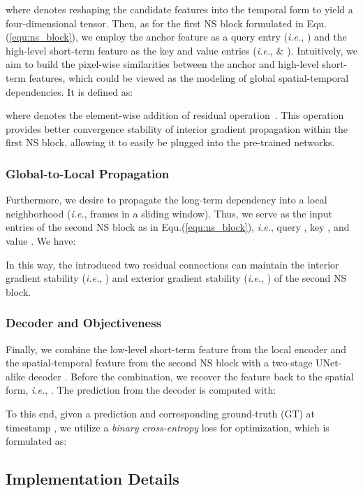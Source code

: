 \documentclass[default,iicol]{sn-jnl}
\theoremstyle{thmstyleone}
\theoremstyle{thmstyletwo}
\theoremstyle{thmstylethree}
\newcommand{\eqnref}[1]{Equ.(\ref{#1})}
\def\ie{\emph{i.e.}}
\begin{document}
where  denotes reshaping the candidate features into the temporal form to yield a four-dimensional tensor.
Then, as for the first NS block formulated in \eqnref{equ:ns_block}, we employ the anchor feature as a query entry (\ie, ) and the high-level short-term feature as the key and value entries (\ie,  \& ).
Intuitively, we aim to build the pixel-wise similarities between the anchor and high-level short-term features, which could be viewed as the modeling of global spatial-temporal dependencies.
It is defined as:

where  denotes the element-wise addition of residual operation~\cite{he2016deep}.
This operation provides better convergence stability of interior gradient propagation within the first NS block, allowing it to easily be plugged into the pre-trained networks.

\subsubsection{Global-to-Local Propagation}\label{sec:g2l_propagation}
Furthermore, we desire to propagate the long-term dependency  into a local neighborhood (\ie, frames in a sliding window).
Thus, we serve  as the input entries of the second NS block as in \eqnref{equ:ns_block}, \ie, query , key , and value .
We have:

In this way, the introduced two residual connections 
can maintain the interior gradient stability (\ie, ) and exterior gradient stability (\ie, ) of the second NS block.

\subsubsection{Decoder and Objectiveness}\label{sec:decoder_and_objectiveness}
Finally, we combine the low-level short-term feature  from the local encoder and the spatial-temporal feature  from the second NS block with a two-stage UNet-alike decoder .
Before the combination, we recover the feature  back to the spatial form, \ie, .
The prediction from the decoder is computed with:

To this end, given a prediction  and corresponding ground-truth (GT)  at timestamp , we utilize a \textit{binary cross-entropy} loss for optimization, which is formulated as:


\subsection{Implementation Details}\label{sec:impl_detail}
\end{document}
